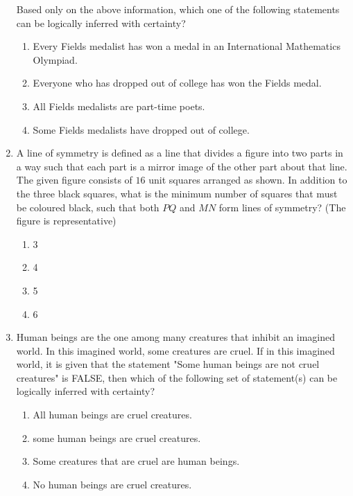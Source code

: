 \documentclass[journal,12pt,onecolumn]{IEEEtran}
\theoremstyle{remark}
\begin{document}
\begin{enumerate}
Based only on the above information, which one of the following statements can be
logically inferred with certainty?

\hfill{}
\begin{enumerate}
    \item Every Fields medalist has won a medal in an International Mathematics Olympiad.
    \item Everyone who has dropped out of college has won the Fields medal.
    \item All Fields medalists are part-time poets.
    \item Some Fields medalists have dropped out of college.
\end{enumerate}

    \item A line of symmetry is defined as a line that divides a figure into two parts in a way such that each part is a mirror image of the other part about that line.
    The given figure consists of $16$ unit squares arranged as shown. In addition to the three black squares, what is the minimum number of squares that must be coloured black, such that both $PQ$ and $MN$ form lines of symmetry? (The figure is representative)
    
\hfill{}

\begin{enumerate}
    \item 3
    \item 4
    \item 5
    \item 6
\end{enumerate}

    \item Human beings are the one among many creatures that inhibit an imagined world. In this imagined world, some creatures are cruel. If in this imagined world, it is given that the statement "Some human beings are not cruel creatures" is FALSE, then which of the following set of statement(s) can be logically inferred with certainty?

\begin{enumerate}[label = \roman*]
    \item All human beings are cruel creatures.
    \item some human beings are cruel creatures.
    \item Some creatures that are cruel are human beings.
    \item No human beings are cruel creatures.
\end{enumerate}


\end{enumerate}
\end{document}
